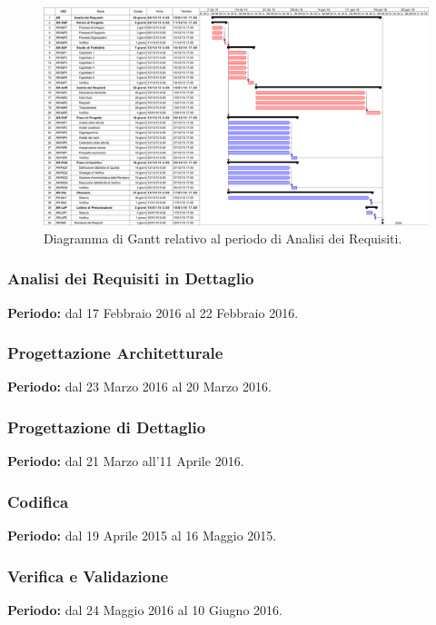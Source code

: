 \begin{figure}
	\centering
	\includegraphics[keepaspectratio = true, width=24cm]{immagini/PdP_AnalisiDeiRequisitiGantt.png}
	\caption{Diagramma di Gantt relativo al periodo di Analisi dei Requisiti.}\label{etichetta}
\end{figure}
\newpage
\subsubsection{Analisi dei Requisiti in Dettaglio}
\textbf{Periodo:} dal 17 Febbraio 2016 al 22 Febbraio 2016. 
\subsubsection{Progettazione Architetturale}
\textbf{Periodo:} dal 23 Marzo 2016 al 20 Marzo 2016. 
\subsubsection{Progettazione di Dettaglio}
\textbf{Periodo:} dal 21 Marzo all'11 Aprile 2016.
\subsubsection{Codifica}
\textbf{Periodo:} dal 19 Aprile 2015 al 16 Maggio 2015. 
\subsubsection{Verifica e Validazione}
\textbf{Periodo:} dal 24 Maggio 2016 al 10 Giugno 2016. 